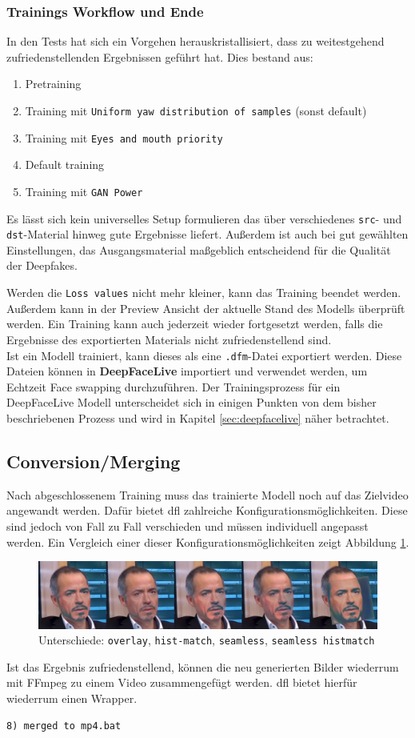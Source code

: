 \subsubsection*{Trainings Workflow und Ende}
In den Tests hat sich ein Vorgehen herauskristallisiert, dass zu weitestgehend zufriedenstellenden Ergebnissen geführt hat.
Dies bestand aus:
\begin{enumerate}
    \item Pretraining
    \item Training mit \texttt{Uniform yaw distribution of samples} (sonst default)
    \item Training mit \texttt{Eyes and mouth priority}
    \item Default training
    \item Training mit \texttt{GAN Power}
\end{enumerate}
Es lässt sich kein universelles Setup formulieren das über verschiedenes \texttt{src}- und \texttt{dst}-Material hinweg gute Ergebnisse liefert.
Außerdem ist auch bei gut gewählten Einstellungen, das Ausgangsmaterial maßgeblich entscheidend für die Qualität der Deepfakes.

Werden die \texttt{Loss values} nicht mehr kleiner, kann das Training beendet werden.
Außerdem kann in der Preview Ansicht der aktuelle Stand des Modells überprüft werden.
Ein Training kann auch jederzeit wieder fortgesetzt werden, falls die Ergebnisse des exportierten Materials nicht zufriedenstellend sind.\\

Ist ein Modell trainiert, kann dieses als eine \texttt{.dfm}-Datei exportiert werden.
Diese Dateien können in \textbf{DeepFaceLive} importiert und verwendet werden, um Echtzeit Face swapping durchzuführen.
Der Trainingsprozess für ein DeepFaceLive Modell unterscheidet sich in einigen Punkten von dem bisher beschriebenen Prozess und wird in Kapitel \ref{sec:deepfacelive} näher betrachtet.

\subsection{Conversion/Merging}\label{subsec:conversion/merging}
Nach abgeschlossenem Training muss das trainierte Modell noch auf das Zielvideo angewandt werden.
Dafür bietet \gls{dfl} zahlreiche Konfigurationsmöglichkeiten.
Diese sind jedoch von Fall zu Fall verschieden und müssen individuell angepasst werden.
Ein Vergleich einer dieser Konfigurationsmöglichkeiten zeigt Abbildung \ref{fig:merger-comparison}.
\begin{figure}
    \center
    \includegraphics[width=\textwidth]{Bilder/DFL/merger-comparison}
    \caption{Unterschiede: \texttt{overlay}, \texttt{hist-match}, \texttt{seamless}, \texttt{seamless histmatch}}
    \label{fig:merger-comparison}
\end{figure}

Ist das Ergebnis zufriedenstellend, können die neu generierten Bilder wiederrum mit FFmpeg zu einem Video zusammengefügt werden.
\gls{dfl} bietet hierfür wiederrum einen Wrapper.
\begin{lstlisting}[numbers=none,label={lst:merged-to-mp4}]
    8) merged to mp4.bat
\end{lstlisting}
